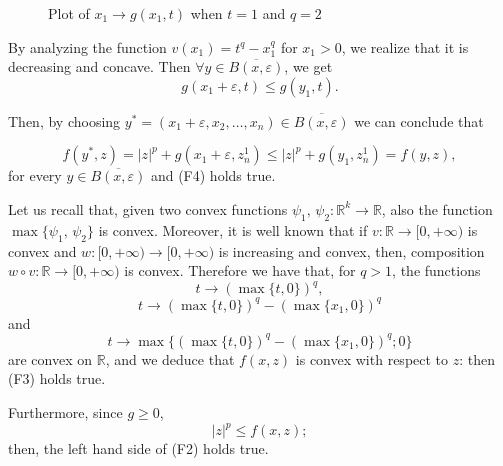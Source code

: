 \documentclass[a4paper,10pt]{article}
\newcommand{\numberset}{\mathbb}
\newcommand{\R}{\numberset{R}}
\theoremstyle{plain}
\theoremstyle{definition}
\def\R{\mathbb{R}}
\numberwithin{equation}{section} \makeatletter
\begin{document}


\begin{figure}[h]
\centering
{}
\caption{Plot of $x_1 \to g(x_1,t)$ when $t=1$ and $q=2$}
 \label{figure2}
\end{figure}

\noindent
By analyzing the function $v(x_1)=t^q-x_1^q$ for $x_1> 0$, we realize that it is decreasing and concave. Then $\forall y\in \overline{B(x,\varepsilon)}$, we get 
$$g(x_1+\varepsilon,t)\le g(y_1,t).$$ 




\noindent
Then, by choosing $y^*=(x_1+\varepsilon,x_2,\ldots,x_n)\in \overline{B(x,\varepsilon)}$ we can conclude that

$$f(y^*,z)=|z|^p+g(x_1+\varepsilon,z_n^1)\le |z|^p+ g(y_1,z_n^1)=f(y,z),$$
for every $y\in \overline{B(x,\varepsilon)}$ and (F4) holds true. 

\noindent
Let us recall that, given two convex functions $\psi_1,\,\psi_2:\R^k\to \R$, also the function  $\max \{\psi_1,\,\psi_2\}$ is convex.  Moreover, it is well known that if $v:\R\to [0, +\infty) $ is convex and  $w:[0, +\infty)\to [0, +\infty)$  is increasing and convex, then, composition $w\circ v:\R\to [0, +\infty) $ is convex.
Therefore we have that, for $q>1$,
the functions $$t\to (\max\{t,0\})^q,$$
$$t\to (\max\{t,0\})^q-(\max\{x_1,0\})^q$$ and 
$$t\to \max\{(\max\{t,0\})^q-(\max\{x_1,0\})^q; 0\}$$ are convex on $\R$, and we deduce that $f(x,z)$ is convex with respect to $z$: then (F3) holds true.


\noindent
\noindent
Furthermore,  since $g \ge0$,
$$|z|^p\le f(x,z);$$
then, the left hand side of (F2) holds true.
\end{document}
